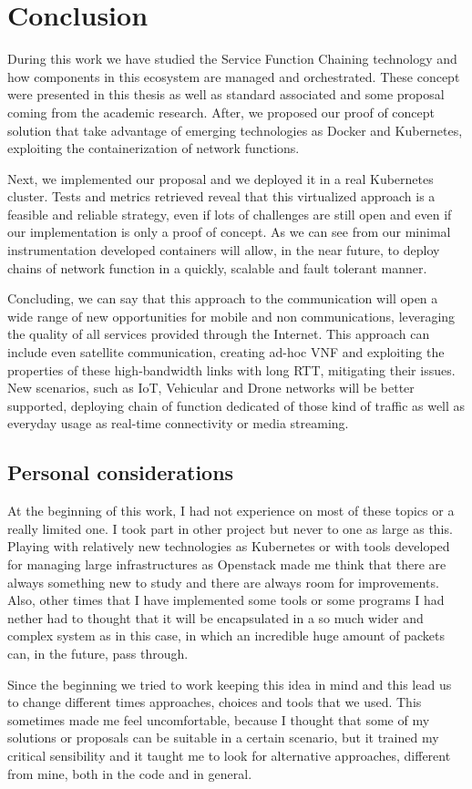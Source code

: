 \chapter{Conclusion}
\label{chap:conclusions}

During this work we have studied the Service Function Chaining
technology and how components in this ecosystem are managed and orchestrated.
These concept were presented in this thesis as well as standard associated and
some proposal coming from the academic research. After, we proposed our
proof of concept solution that take advantage of emerging technologies as Docker
and Kubernetes, exploiting the containerization of network functions.

Next, we implemented our proposal and we deployed it in a real Kubernetes
cluster. Tests and metrics retrieved reveal that this virtualized approach is a
feasible and reliable strategy, even if lots of challenges are still open and
even if our implementation is only a proof of concept. As we can see from our
minimal instrumentation developed containers will allow, in the near future, to
deploy chains of network function in a quickly, scalable and fault tolerant
manner. 

Concluding, we can say that this approach to the communication will open a wide
range of new opportunities for mobile and non communications, leveraging the
quality of all services provided through the Internet. This approach can include
even satellite communication, creating ad-hoc VNF and exploiting the properties
of these high-bandwidth links with long RTT, mitigating their issues. New
scenarios, such as IoT, Vehicular and Drone networks will be better supported,
deploying chain of function dedicated of those kind of traffic as well as
everyday usage as real-time connectivity or media streaming.

\section*{Personal considerations}
At the beginning of this work, I had not experience on most of these topics
or a really limited one. I took part in other project but never to one as large
as this. Playing with relatively new technologies as Kubernetes or with tools
developed for managing large infrastructures as Openstack made me think that
there are always something new to study and there are always room for
improvements. Also, other times that I have implemented some tools or some
programs I had nether had to thought that it will be encapsulated in a so much
wider and complex system as in this case, in which an incredible huge amount of
packets can, in the future, pass through.

Since the beginning we tried to work keeping this idea in mind and this lead us
to change different times approaches, choices and tools that we used. This
sometimes made me feel uncomfortable, because I thought that some of my
solutions or proposals can be suitable in a certain scenario, but it trained my
critical sensibility and it taught me to look for alternative approaches,
different from mine, both in the code and in general.